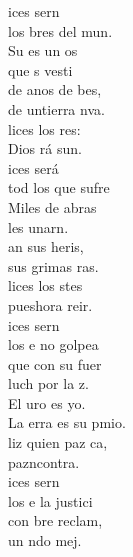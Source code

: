 \documentclass[12pt]{article}
\begin{document}
\begin{multicols*}{2}
\begin{cancion}%
	ices sern\\
	los bres del mun.\\
	Su  es un os\\
	que s vesti \\
	de anos de bes,\\
	de untierra nva.\\
	lices los res:\\
	Dios rá sun.\\
	ices será\\
	tod los que sufre\\
	Miles de abras\\
	les unarn.\\
	an sus heris,\\
	sus grimas ras. \\
	lices los stes\\
	pueshora reir.\\
	ices sern\\
	los e no golpea\\
	 que con su fuer\\
	luch por la z.\\
	El uro es yo.\\
	La erra es su pmio.\\
	liz quien paz ca,\\
	pazncontra.\\
	ices sern\\
	los e la justici\\
	con bre reclam,\\
	un ndo mej.\\

\end{cancion}
\end{multicols*}
\end{document}
